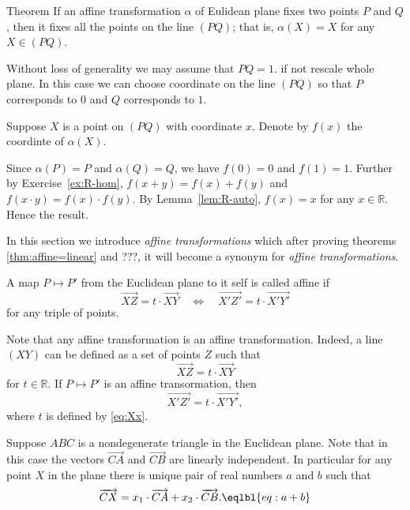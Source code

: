 \begin{thm}{Theorem}
If an affine transformation $\alpha$ of Eulidean plane fixes two points $P$ and $Q$,
then it fixes all the points on the line $(PQ)$;
that is, $\alpha(X)=X$ for any $X\in (PQ)$.
\end{thm}

Without loss of generality we may assume that $PQ=1$.
if not rescale whole plane.
In this case we can choose coordinate on the line $(PQ)$ so that $P$ corresponds to $0$ and $Q$ corresponds to $1$.

Suppose $X$ is a point on $(PQ)$ with coordinate $x$.
Denote by $f(x)$ the coordinte of $\alpha(X)$.

Since $\alpha(P)=P$ and $\alpha(Q)=Q$, we have $f(0)=0$ and $f(1)=1$.
Further by Exercise~\ref{ex:R-hom}, $f(x+y)=f(x)+f(y)$ and $f(x\cdot y)=f(x)\cdot f(y)$.
By Lemma~\ref{lem:R-auto}, $f(x)=x$ for any $x\in \mathbb{R}$.
Hence the result.
\qeds


















In this section we introduce \emph{affine transformations} which after proving theorems \ref{thm:affine=linear} and ???, it will become a synonym for \emph{affine transformations}.

A map $P\mapsto P'$ from the Euclidean plane to it self is called affine 
if
\[\overrightarrow{XZ}=t\cdot \overrightarrow{XY}
\quad\Longleftrightarrow\quad
\overrightarrow{X'Z'}=t\cdot \overrightarrow{X'Y'}\]
for any triple of points.

Note that any affine transformation is an affine transformation.
Indeed, a line $(XY)$ can be defined as a set of points $Z$ such that 
\[\overrightarrow{XZ}=t\cdot \overrightarrow{XY}\]
for $t\in \mathbb{R}$.
If $P\mapsto P'$ is an affine transormation, then 
\[\overrightarrow{X'Z'}=t\cdot \overrightarrow{X'Y'},\]
where $t$ is defined by \ref{eq:Xx}.

Suppose $ABC$ is a nondegenerate triangle in the Euclidean plane.
Note that in this case the vectors $\overrightarrow{CA}$ and $\overrightarrow{CB}$ are linearly independent.
In particular for any point $X$ in the plane there is unique pair of real numbers $a$ and $b$ such that 
\[\overrightarrow{CX}=x_1\cdot \overrightarrow{CA}+x_2\cdot \overrightarrow{CB}.\eqlbl{eq:a+b}\]

